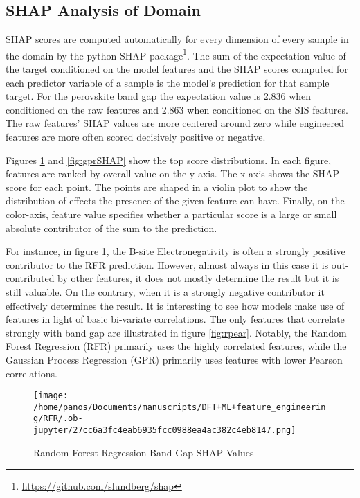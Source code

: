 \subsection{SHAP Analysis of Domain}
\label{sec:orgfa003dc}
SHAP scores are computed automatically for every dimension of every sample in the domain by the python SHAP package\footnote{\url{https://github.com/slundberg/shap}}.
The sum of the expectation value of the target conditioned on the model features and the  SHAP scores computed for each predictor variable of a sample is the model's  prediction for that sample target.
\autocite{lundberg-2017-unified-approac}
For the perovskite band gap the expectation value is 2.836 when conditioned on the raw features and 2.863 when conditioned on the SIS features.
The raw features' SHAP values are more centered around zero while engineered features are more often scored decisively positive or negative.

Figures \ref{fig:rfrSHAP} and \ref{fig:gprSHAP} show the top score distributions.
In each figure, features are ranked by overall value on the y-axis.
The x-axis shows the SHAP score for each point.
The points are shaped in a violin plot to show the distribution of effects the presence of the given feature can have.
Finally, on the color-axis, feature value specifies whether a particular score is a large or small absolute contributor of the sum to the prediction.

For instance, in figure \ref{fig:rfrSHAP}, the B-site Electronegativity is often a strongly positive contributor to the RFR prediction.
However, almost always in this case it is out-contributed by other features, it does not mostly determine the result but it is still valuable.
On the contrary, when it is a strongly negative contributor it effectively determines the result.
It is interesting to see how models make use of features in light of basic bi-variate correlations.
The only features that correlate strongly with band gap are illustrated in figure \ref{fig:rpear}.
Notably, the Random Forest Regression (RFR) primarily uses the highly correlated features, while the Gaussian Process Regression (GPR) primarily uses features with lower Pearson correlations.

\begin{figure}[htbp]
\centering
\texttt{[image: /home/panos/Documents/manuscripts/DFT+ML+feature\_engineering/RFR/.ob-jupyter/27cc6a3fc4eab6935fcc0988ea4ac382c4eb8147.png]}
\caption{\label{fig:rfrSHAP} Random Forest Regression Band Gap SHAP Values}
\end{figure}

